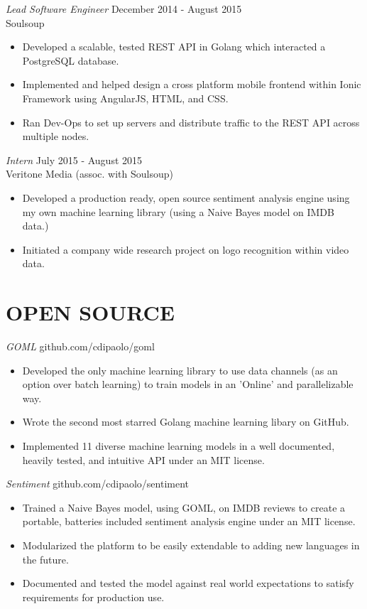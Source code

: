 \documentclass[margin, 10pt]{res} %
\begin{document}
\begin{resume}
{\sl Lead Software Engineer} \hfill December 2014 - August 2015 \\
Soulsoup
\begin{itemize}
\item Developed a scalable, tested REST API in Golang which interacted a PostgreSQL database.
\item Implemented and helped design a cross platform mobile frontend within Ionic Framework using AngularJS, HTML, and CSS.
\item Ran Dev-Ops to set up servers and distribute traffic to the REST API across multiple nodes.
\end{itemize} 

{\sl Intern} \hfill July 2015 - August 2015 \\
Veritone Media (assoc. with Soulsoup)
\begin{itemize}
\item Developed a production ready, open source sentiment analysis engine using my own machine learning library (using a Naive Bayes model on IMDB data.)
\item Initiated a company wide research project on logo recognition within video data.
\end{itemize}

\section{OPEN SOURCE}

{\sl GOML} \hfill github.com/cdipaolo/goml
\begin{itemize}
\item Developed the only machine learning library to use data channels (as an option over batch learning) to train models in an 'Online' and parallelizable way.
\item Wrote the second most starred Golang machine learning libary on GitHub.
\item Implemented 11 diverse machine learning models in a well documented, heavily tested, and intuitive API under an MIT license.
\end{itemize} 

{\sl Sentiment} \hfill github.com/cdipaolo/sentiment
\begin{itemize}
\item Trained a Naive Bayes model, using GOML, on IMDB reviews to create a portable, batteries included sentiment analysis engine under an MIT license.
\item Modularized the platform to be easily extendable to adding new languages in the future.
\item Documented and tested the model against real world expectations to satisfy requirements for production use.
\end{itemize}


\end{resume}
\end{document}

